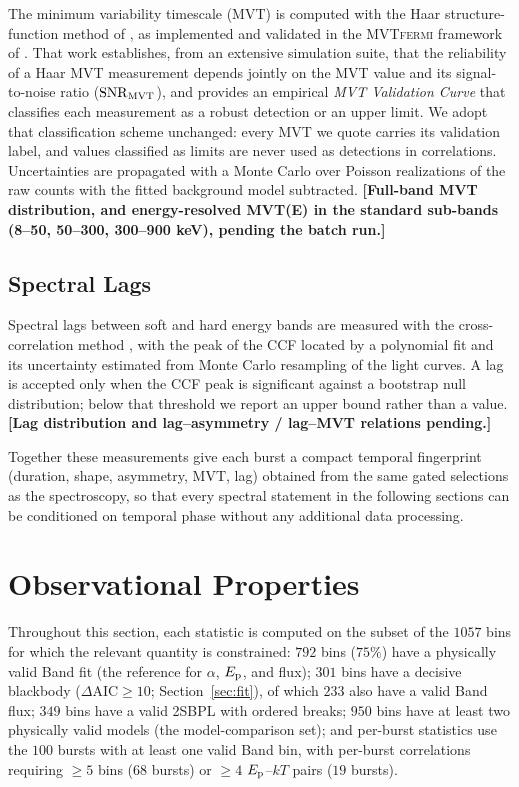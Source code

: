 \documentclass[twocolumn]{aastex631}
\newcommand{\Ep}{\ensuremath{E_{\rm p}}}
\newcommand{\kT}{\ensuremath{kT}}
\newcommand{\daic}{\ensuremath{\Delta\mathrm{AIC}}}
\newcommand{\PHt}[1]{\textbf{[#1]}}
\begin{document}
The minimum variability timescale (MVT) is computed with the Haar
structure-function method of \citet{Golkhou2014,Golkhou2015}, as implemented
and validated in the \textsc{MVTfermi} framework of \citet{Bala2025}. That
work establishes, from an extensive simulation suite, that the reliability
of a Haar MVT measurement depends jointly on the MVT value and its
signal-to-noise ratio ($\mathrm{SNR}_{\rm MVT}$), and provides an empirical
\emph{MVT Validation Curve} that classifies each measurement as a robust
detection or an upper limit. We adopt that classification scheme unchanged:
every MVT we quote carries its validation label, and values classified as
limits are never used as detections in correlations. Uncertainties are
propagated with a Monte Carlo over Poisson realizations of the raw counts
with the fitted background model subtracted. \PHt{Full-band MVT
distribution, and energy-resolved MVT(E) in the standard sub-bands
(8--50, 50--300, 300--900 keV), pending the batch run.}

\subsection{Spectral Lags} \label{sec:lags}

Spectral lags between soft and hard energy bands are measured with the
cross-correlation method \citep{Norris1996}, with the peak of the CCF
located by a polynomial fit and its uncertainty estimated from Monte Carlo
resampling of the light curves. A lag is accepted only when the CCF peak is
significant against a bootstrap null distribution; below that threshold we
report an upper bound rather than a value. \PHt{Lag distribution and
lag--asymmetry / lag--MVT relations pending.}

Together these measurements give each burst a compact temporal fingerprint
(duration, shape, asymmetry, MVT, lag) obtained from the same gated
selections as the spectroscopy, so that every spectral statement in the
following sections can be conditioned on temporal phase without any
additional data processing.

\section{Observational Properties} \label{sec:obs}
Throughout this section, each statistic is computed on the subset of the
$1057$ bins for which the relevant quantity is constrained: $792$ bins
($75\%$) have a physically valid Band fit (the reference for $\alpha$, \Ep,
and flux); $301$ bins have a decisive blackbody ($\daic\ge10$;
Section~\ref{sec:fit}), of which $233$ also have a valid Band flux; $349$ bins
have a valid 2SBPL with ordered breaks; $950$ bins have at least two
physically valid models (the model-comparison set); and per-burst statistics
use the $100$ bursts with at least one valid Band bin, with per-burst
correlations requiring $\ge$$5$ bins ($68$ bursts) or $\ge$$4$
$\Ep$--$\kT$ pairs ($19$ bursts).
\end{document}
